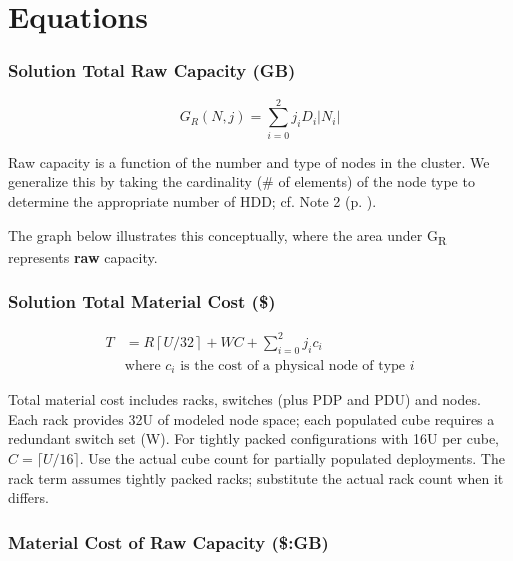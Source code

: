 \section{Equations}\label{equations-1}

\subsubsection*{Solution Total Raw Capacity (GB)}


\nopagebreak
\begin{equation}\label{eq:1}
G_R(N,j)=\sum_{i=0}^{2}j_iD_i\lvert N_i\rvert
\end{equation}


Raw capacity is a function of the number and type of nodes in the cluster. We generalize this by taking the cardinality (\# of elements) of the node type to determine the appropriate number of HDD; cf. Note 2 (p. \pageref{note:normalization}).


The graph below illustrates this conceptually, where the area under G\textsubscript{R} represents \textbf{raw} capacity.

\begin{center}
\resizebox{.65\linewidth}{!}{}
\end{center}


\subsubsection*{Solution Total Material Cost (\$)}


\nopagebreak
\begin{equation}\label{eq:2}
\begin{aligned}T&=R\left\lceil U/32\right\rceil+WC+\sum_{i=0}^{2}j_i c_i\\ &\text{where }c_i\text{ is the cost of a physical node of type }i\end{aligned}
\end{equation}


Total material cost includes racks, switches (plus PDP and PDU) and nodes. Each rack provides 32U of modeled node space; each populated cube requires a redundant switch set (W). For tightly packed configurations with 16U per cube, \(C=\lceil U/16\rceil\). Use the actual cube count for partially populated deployments. The rack term assumes tightly packed racks; substitute the actual rack count when it differs.

\subsubsection*{Material Cost of Raw Capacity (\$:GB)}


